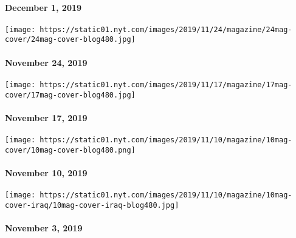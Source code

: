 \hypertarget{december-1-2019}{%
\paragraph{December 1, 2019}\label{december-1-2019}}

\href{https://www.nytimes.com/issue/magazine/2019/11/22/the-112419-issue}{}

\texttt{[image: https://static01.nyt.com/images/2019/11/24/magazine/24mag-cover/24mag-cover-blog480.jpg]}

\hypertarget{november-24-2019}{%
\paragraph{November 24, 2019}\label{november-24-2019}}

\href{https://www.nytimes.com/issue/magazine/2019/11/15/the-111719-issue}{}

\texttt{[image: https://static01.nyt.com/images/2019/11/17/magazine/17mag-cover/17mag-cover-blog480.jpg]}

\hypertarget{november-17-2019}{%
\paragraph{November 17, 2019}\label{november-17-2019}}

\href{https://www.nytimes.com/issue/magazine/2019/11/09/the-111019-issue}{}

\texttt{[image: https://static01.nyt.com/images/2019/11/10/magazine/10mag-cover/10mag-cover-blog480.png]}

\hypertarget{november-10-2019}{%
\paragraph{November 10, 2019}\label{november-10-2019}}

\href{https://www.nytimes.com/issue/magazine/2019/11/01/the-11319-issue}{}

\texttt{[image: https://static01.nyt.com/images/2019/11/10/magazine/10mag-cover-iraq/10mag-cover-iraq-blog480.jpg]}

\hypertarget{november-3-2019}{%
\paragraph{November 3, 2019}\label{november-3-2019}}

\href{https://www.nytimes.com/issue/magazine/2019/10/25/the-102719-issue}{}

